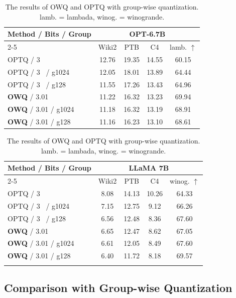 \documentclass[letterpaper]{article} %
\begin{document}
\begin{table}[t]
        \centering
        \small
\begin{tabular}{lcccc}
\toprule
\multirow{2}{*}{Method / Bits / Group} & \multicolumn{4}{c}{OPT-6.7B}\\ \cline{2-5}
 & Wiki2 & PTB & C4 & lamb. $\uparrow$   \\ 
\midrule
OPTQ / 3 & 12.76 & 19.35 & 14.55 & 60.15 \\
OPTQ / 3 \quad \, / g1024 & 12.05 & 18.01 & 13.89 & 64.44   \\
OPTQ / 3 \quad \, / g128 & 11.55 & 17.26 & 13.43 & 64.96  \\ 
\midrule
\textbf{OWQ} / 3.01 & 11.22 & 16.32 & 13.23 & 69.94   \\
\textbf{OWQ} / 3.01 / g1024 & 11.18 & 16.32 & 13.19 & 68.91   \\
\textbf{OWQ} / 3.01 / g128 & 11.16 & 16.23 & 13.10 & 68.61 \\ \bottomrule
 
 \end{tabular}
 \begin{tabular}{lcccc}
 \toprule
\multirow{2}{*}{Method / Bits / Group}  & \multicolumn{4}{c}{LLaMA 7B} \\ \cline{2-5}
 & Wiki2 & PTB & C4 & winog. $\uparrow$ \\ 
\midrule
OPTQ / 3 & 8.08 & 14.13 & 10.26 & 64.33 \\
OPTQ / 3 \quad \, / g1024 & 7.15 & 12.75 & 9.12 & 66.26 \\
OPTQ / 3 \quad \, / g128 & 6.56 & 12.48 & 8.36 & 67.60 \\ 
\midrule
\textbf{OWQ} / 3.01 & 6.65 & 12.47 & 8.62 & 67.05 \\
\textbf{OWQ} / 3.01 / g1024 & 6.61 & 12.05 & 8.49 & 67.60 \\
\textbf{OWQ} / 3.01 / g128 & 6.40 & 11.72 & 8.18 & 69.57 \\ \bottomrule
 &  &  &  & 
\end{tabular}
 \caption{The results of OWQ and OPTQ with group-wise quantization. lamb. = lambada, winog. = winogrande.}
 \label{table:group}
\end{table}

\subsection{Comparison with Group-wise Quantization}
\end{document}
